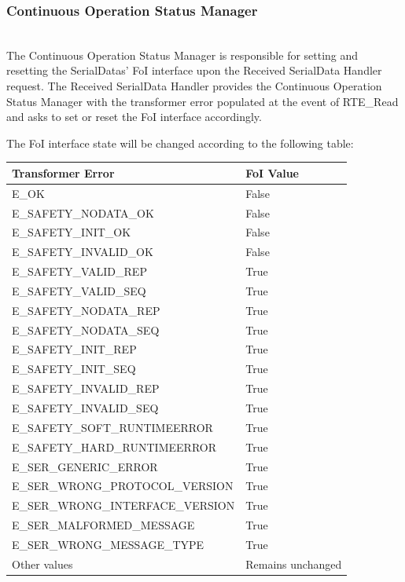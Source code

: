 \subsubsection{Continuous Operation Status Manager}
\\
\label{sec:ContinuousOperationStatusDynamic}
The Continuous Operation Status Manager is responsible for setting and resetting the SerialDatas' FoI interface upon the Received SerialData Handler request.
The Received SerialData Handler provides the Continuous Operation Status Manager with the transformer error populated at the event of RTE_Read and asks to set or reset the FoI interface accordingly.

The FoI interface state will be changed according to the following table:

\begin{table}[H]
    \begin{tabular}{|l|l|}
    \hline
    \textbf{Transformer Error} &  \textbf{FoI Value}\\ \hline
    E_OK                           & False \\ \hline
    E_SAFETY_NODATA_OK             & False \\ \hline
    E_SAFETY_INIT_OK               & False \\ \hline
    E_SAFETY_INVALID_OK            & False \\ \hline
    E_SAFETY_VALID_REP             & True \\ \hline
    E_SAFETY_VALID_SEQ             & True \\ \hline
    E_SAFETY_NODATA_REP            & True \\ \hline
    E_SAFETY_NODATA_SEQ            & True \\ \hline
    E_SAFETY_INIT_REP              & True \\ \hline
    E_SAFETY_INIT_SEQ              & True \\ \hline
    E_SAFETY_INVALID_REP           & True \\ \hline
    E_SAFETY_INVALID_SEQ           & True \\ \hline
    E_SAFETY_SOFT_RUNTIMEERROR     & True \\ \hline
    E_SAFETY_HARD_RUNTIMEERROR     & True \\ \hline
    E_SER_GENERIC_ERROR            & True \\ \hline
    E_SER_WRONG_PROTOCOL_VERSION   & True \\ \hline
    E_SER_WRONG_INTERFACE_VERSION  & True \\ \hline
    E_SER_MALFORMED_MESSAGE        & True \\ \hline
    E_SER_WRONG_MESSAGE_TYPE       & True \\ \hline
    Other values                   & Remains unchanged \\ \hline
    \end{tabular}
\end{table}

